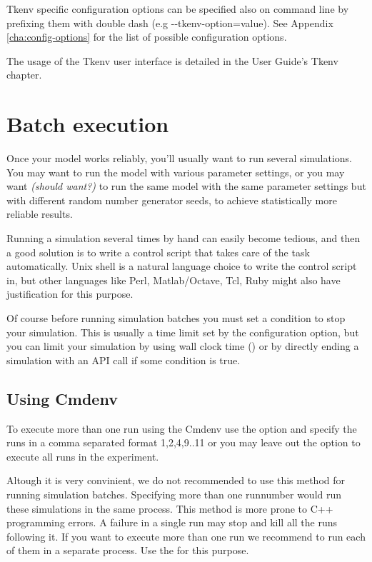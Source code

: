 Tkenv specific configuration options can be specified also on command line
by prefixing them with double dash (e.g -{}-tkenv-option=value). See
Appendix \ref{cha:config-options} for the list of possible configuration options.

\begin{note}
The usage of the Tkenv user interface is detailed in the \opp  User Guide's Tkenv 
chapter.
\end{note}

\section{Batch execution}
\label{sec:ch-run-sim:batch-execution}

Once your model works reliably, you'll usually want to run several
simulations. You may want to run the model with various
parameter settings, or you may want \textit{(should want?)} to
run the same model with the same parameter settings but with
different random number generator seeds, to achieve statistically
more reliable results.

Running a simulation several times by hand can easily become tedious,
and then a good solution is to write a control script that
takes care of the task automatically. Unix shell is
a natural language choice to write the control script in,
but other languages like Perl, Matlab/Octave, Tcl, Ruby might also have
justification for this purpose.

Of course before running simulation batches you must set a condition to
stop your simulation. This is usually a time limit set by the
 configuration option, but you can limit your simulation
by using wall clock time () or by directly ending a
simulation with an API call if some condition is true.

\subsection{Using Cmdenv}

  To execute more than one run using the Cmdenv use the  option
  and specify the runs in a comma separated format 1,2,4,9..11 or you may leave
  out the  option to execute all runs in the experiment.

\begin{warning}
  Altough it is very convinient, we do not recommended to use this method for
  running simulation batches. Specifying more than one runnumber
  would run these simulations in the same process. This method is more prone to C++ programming
  errors. A failure in a single run may stop and kill all the runs following it. If you want
  to execute more than one run we recommend to run each of them in a separate process.
  Use the  for this purpose.
\end{warning}


